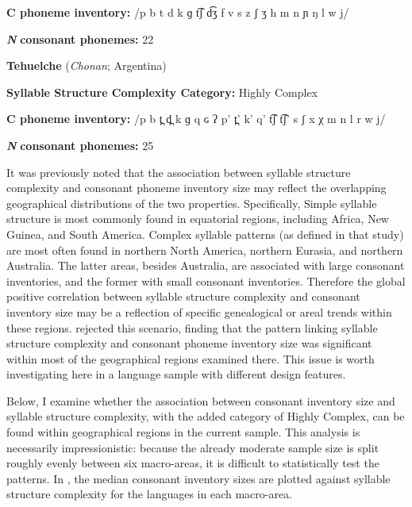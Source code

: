 \textbf{C phoneme inventory:} /p b t d k ɡ t͡ʃ d͡ʒ f v s z ʃ ʒ h m n ɲ ŋ l w j/

\textbf{\textit{N}} \textbf{consonant phonemes:} 22
\z

\ea\label{ex:4.25}
  \textbf{Tehuelche} (\textit{Chonan}; Argentina)

\textbf{Syllable Structure Complexity Category:} Highly Complex

\textbf{C phoneme inventory:} /p b t̪ d̪ k ɡ q ɢ ʔ p’ t̪’ k’ q’ t͡ʃ t͡ʃ’ s ʃ x χ m n l r w j/

\textbf{\textit{N}} \textbf{consonant phonemes:} 25
\z

  It was previously noted that the association between syllable structure complexity and consonant phoneme inventory size may reflect the overlapping geographical distributions of the two properties. Specifically, Simple syllable structure is most commonly found in equatorial regions, including Africa, New Guinea, and South America. Complex syllable patterns (as defined in that study) are most often found in northern North America, northern Eurasia, and northern Australia. The latter areas, besides Australia, are associated with large consonant inventories, and the former with small consonant inventories. Therefore the global positive correlation between syllable structure complexity and consonant inventory size may be a reflection of specific genealogical or areal trends within these regions. \citet{Maddieson2006} rejected this scenario, finding that the pattern linking syllable structure complexity and consonant phoneme inventory size was significant within most of the geographical regions examined there. This issue is worth investigating here in a language sample with different design features.

  Below, I examine whether the association between consonant inventory size and syllable structure complexity, with the added category of Highly Complex, can be found within geographical regions in the current sample. This analysis is necessarily impressionistic: because the already moderate sample size is split roughly evenly between six macro-areas, it is difficult to statistically test the patterns. In , the median consonant inventory sizes are plotted against syllable structure complexity for the languages in each macro-area.


